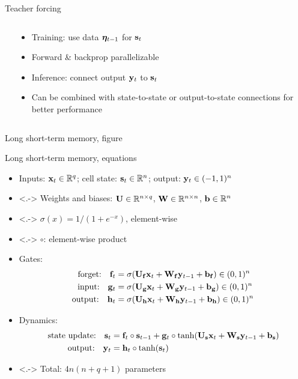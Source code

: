 \begin{frame}{Teacher forcing}
    \begin{columns}
        \begin{column}{0.47\textwidth}
            
        \end{column}
        \begin{column}{0.53\textwidth}
            \begin{itemize}[<.->]
                \item Training: use data $\bm{\eta}_{t-1}$ for $\mathbf{s}_t$
                \item Forward \& backprop parallelizable
                \item<+-> Inference: connect output $\mathbf{y}_t$ to $\mathbf{s}_t$
                \item Can be combined with state-to-state or output-to-state connections for better performance
            \end{itemize}
        \end{column}
    \end{columns}
\end{frame}

\begin{frame}{Long short-term memory, figure}
    \centering
    
\end{frame}

\begin{frame}{Long short-term memory, equations}
    \begin{itemize}
        \item<+-> Inputs: $\mathbf{x}_t \in \mathbb{R}^q$; cell state: $\mathbf{s}_t \in \mathbb{R}^n$; output: $\mathbf{y}_t \in (-1, 1)^n$
        \item<.-> Weights and biases: $\mathbf{U} \in \mathbb{R}^{n \times q}$, $\mathbf{W} \in \mathbb{R}^{n \times n}$, $\mathbf{b} \in \mathbb{R}^n$
        \item<.-> $\sigma(x) = 1 / (1 + e^{-x})$, element-wise
        \item<.-> $\circ$: element-wise product
        \item<+-> Gates:
        \begin{align*}
            \text{forget:} \quad \mathbf{f}_t &= \sigma(\mathbf{U}_{\mathbf{f}} \mathbf{x}_t + \mathbf{W}_{\mathbf{f}} \mathbf{y}_{t-1} + \mathbf{b}_{\mathbf{f}}) \in (0, 1)^n \\
            \text{input:} \quad \mathbf{g}_t &= \sigma(\mathbf{U}_{\mathbf{g}} \mathbf{x}_t + \mathbf{W}_{\mathbf{g}} \mathbf{y}_{t-1} + \mathbf{b}_{\mathbf{g}}) \in (0, 1)^n \\
            \text{output:} \quad \mathbf{h}_t &= \sigma(\mathbf{U}_{\mathbf{h}} \mathbf{x}_t + \mathbf{W}_{\mathbf{h}} \mathbf{y}_{t-1} + \mathbf{b}_{\mathbf{h}}) \in (0, 1)^n
        \end{align*}
        \item<+-> Dynamics:
        \begin{align*}
            \text{state update:} \quad \mathbf{s}_t &= \mathbf{f}_t \circ \mathbf{s}_{t-1} + \mathbf{g}_t \circ \tanh(\mathbf{U}_{\mathbf{s}} \mathbf{x}_t + \mathbf{W}_{\mathbf{s}} \mathbf{y}_{t-1} + \mathbf{b}_{\mathbf{s}}) \\
            \text{output:} \quad \mathbf{y}_t &= \mathbf{h}_t \circ \tanh(\mathbf{s}_t)
        \end{align*}
        \item<.-> Total: $4 n (n + q + 1)$ parameters
    \end{itemize}
\end{frame}

